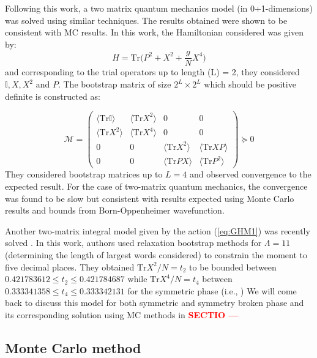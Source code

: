 \documentclass[11pt]{article}
\newcommand{\TODO}[1]{\textcolor{red}{{\bf #1}}}
\begin{document}
Following this work, a two matrix quantum mechanics 
model (in 0+1-dimensions) was solved using similar techniques. 
The results obtained were shown to be consistent with MC results. 
In this work, the Hamiltonian considered was given by:
\begin{equation}
H = \mbox{Tr} \Big( P^2 + X^2 + \frac{g}{N} X^4 \Big)
\end{equation}
and corresponding to the trial operators up to length (L) = 2, 
they considered $ \mathbb{I}, X, X^{2}$ and $P$. The bootstrap matrix
of size $2^L \times 2^L$ which should be positive definite is constructed as:

\begin{equation}
	\mathcal{M} = 
	\begin{pmatrix}
		\langle \mbox{Tr}\mathbb{I} \rangle & \langle \mbox{Tr} X^2 \rangle & 0 & 0 \\
		\langle \mbox{Tr} X^2 \rangle & \langle \mbox{Tr} X^4 \rangle  & 0 & 0 \\ 
		0 & 0 & \langle \mbox{Tr} X^2 \rangle & \langle \mbox{Tr} XP \rangle \\
		0 & 0  & \langle \mbox{Tr} PX \rangle & \langle \mbox{Tr} P^2 \rangle
	\end{pmatrix}  \succeq 0
\end{equation}
They considered bootstrap matrices up to $L=4$ and observed
convergence to the expected result. 
For the case of two-matrix quantum mechanics, the convergence
was found to be slow but consistent with results expected using 
Monte Carlo results and bounds from Born-Oppenheimer wavefunction. 

Another two-matrix integral model given by the action 
(\ref{eq:GHM1}) was recently solved \cite{Kazakov:2021lel}. 
In this work, authors used relaxation bootstrap methods for 
$\Lambda=11$ (determining the length of largest words considered)
to constrain the moment to five decimal places. They obtained $\mathrm{Tr}X^2/N = t_2$ 
to be bounded between $ 0.421783612 \le t_2 \le 0.421784687$ while $\mathrm{Tr}X^4/N = t_4$ 
between $0.333341358 \le t_4 \le 0.333342131$ for the symmetric phase (i.e., )
We will come back to discuss this model for both symmetric and symmetry broken
phase and its corresponding solution using MC methods in 
\TODO{SECTIO ---}



\subsection{Monte Carlo method}
\end{document}
